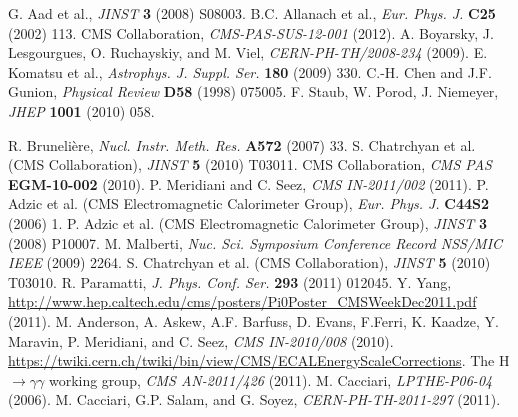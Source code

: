\documentclass[12pt, letterpaper]{report}
\begin{document}
\begin{thebibliography}{99}
 G. Aad et al., \textit{JINST} \textbf{3} (2008) S08003.
 B.C. Allanach et al., \textit{Eur. Phys. J.} \textbf{C25} (2002) 113.
 CMS Collaboration, \textit{CMS-PAS-SUS-12-001} (2012).
 A. Boyarsky, J. Lesgourgues, O. Ruchayskiy, and M. Viel, \textit{CERN-PH-TH/2008-234} (2009).
 E. Komatsu et al., \textit{Astrophys. J. Suppl. Ser.} \textbf{180} (2009) 330.
 C.-H. Chen and J.F. Gunion, \textit{Physical Review} \textbf{D58} (1998) 075005.
 F. Staub, W. Porod, J. Niemeyer, \textit{JHEP} \textbf{1001} (2010) 058.


 R. Bruneli\`ere, \textit{Nucl. Instr. Meth. Res.} \textbf{A572} (2007) 33.
 S. Chatrchyan et al. (CMS Collaboration), \textit{JINST} \textbf{5} (2010) T03011.
 CMS Collaboration, \textit{CMS PAS} \textbf{EGM-10-002} (2010).
 P. Meridiani and C. Seez, \textit{CMS IN-2011/002} (2011).
 P. Adzic et al. (CMS Electromagnetic Calorimeter Group), \textit{Eur. Phys. J.} \textbf{C44S2} (2006) 1.
 P. Adzic et al. (CMS Electromagnetic Calorimeter Group), \textit{JINST} \textbf{3} (2008) P10007.
 M. Malberti, \textit{Nuc. Sci. Symposium Conference Record NSS/MIC IEEE} (2009) 2264.
 S. Chatrchyan et al. (CMS Collaboration), \textit{JINST} \textbf{5} (2010) T03010.
 R. Paramatti, \textit{J. Phys. Conf. Ser.} \textbf{293} (2011) 012045.
 Y. Yang, \url{http://www.hep.caltech.edu/cms/posters/Pi0Poster_CMSWeekDec2011.pdf} (2011).
 M. Anderson, A. Askew, A.F. Barfuss, D. Evans, F.Ferri, K. Kaadze, Y. 
Maravin, P. Meridiani, and C. Seez, \textit{CMS IN-2010/008} (2010).
 \url{https://twiki.cern.ch/twiki/bin/view/CMS/ECALEnergyScaleCorrections}.
 The H$\rightarrow\gamma\gamma$ working group, \textit{CMS AN-2011/426} (2011).
 M. Cacciari, \textit{LPTHE-P06-04} (2006).
 M. Cacciari, G.P. Salam, and G. Soyez, \textit{CERN-PH-TH-2011-297} (2011).

\end{thebibliography}
\end{document}
